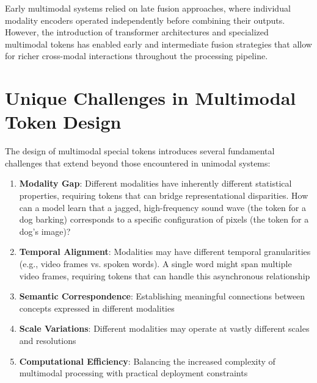 Early multimodal systems relied on late fusion approaches, where individual modality encoders operated independently before combining their outputs. However, the introduction of transformer architectures and specialized multimodal tokens has enabled early and intermediate fusion strategies that allow for richer cross-modal interactions throughout the processing pipeline.

\section{Unique Challenges in Multimodal Token Design}

The design of multimodal special tokens introduces several fundamental challenges that extend beyond those encountered in unimodal systems:

\begin{enumerate}
\item \textbf{Modality Gap}: Different modalities have inherently different statistical properties, requiring tokens that can bridge representational disparities. How can a model learn that a jagged, high-frequency sound wave (the token for a dog barking) corresponds to a specific configuration of pixels (the token for a dog's image)?
\item \textbf{Temporal Alignment}: Modalities may have different temporal granularities (e.g., video frames vs. spoken words). A single word might span multiple video frames, requiring tokens that can handle this asynchronous relationship
\item \textbf{Semantic Correspondence}: Establishing meaningful connections between concepts expressed in different modalities
\item \textbf{Scale Variations}: Different modalities may operate at vastly different scales and resolutions
\item \textbf{Computational Efficiency}: Balancing the increased complexity of multimodal processing with practical deployment constraints
\end{enumerate}
\begin{comment}
Examples for the above challenges:
- Modality Gap: "How can a model learn that a jagged, high-frequency sound wave (the token for a dog barking) corresponds to a specific configuration of pixels (the token for a dog's image)?"
- Temporal Alignment: "A single word might span multiple video frames, requiring tokens that can handle this asynchronous relationship."

STATUS: addressed - added concrete examples for Modality Gap and Temporal Alignment challenges
\end{comment}

